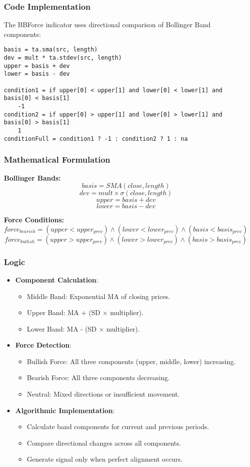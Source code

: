 \documentclass[12pt]{article}
\begin{document}
\subsubsection{Code Implementation}
The BBForce indicator uses directional comparison of Bollinger Band components:

\begin{lstlisting}[language=Pine, caption=Pine Script Code for BBForce Calculation]
basis = ta.sma(src, length)
dev = mult * ta.stdev(src, length)
upper = basis + dev
lower = basis - dev

condition1 = if upper[0] < upper[1] and lower[0] < lower[1] and basis[0] < basis[1]
    -1
condition2 = if upper[0] > upper[1] and lower[0] > lower[1] and basis[0] > basis[1]
    1
conditionFull = condition1 ? -1 : condition2 ? 1 : na
\end{lstlisting}

\subsubsection{Mathematical Formulation}
\textbf{Bollinger Bands:}
\[
basis = SMA(close, length)
\]
\[
dev = mult \times \sigma(close, length)
\]
\[
upper = basis + dev
\]
\[
lower = basis - dev
\]

\textbf{Force Conditions:}
\[
force_{bearish} = (upper < upper_{prev}) \land (lower < lower_{prev}) \land (basis < basis_{prev})
\]
\[
force_{bullish} = (upper > upper_{prev}) \land (lower > lower_{prev}) \land (basis > basis_{prev})
\]

\subsubsection{Logic}
\begin{itemize}
\item \textbf{Component Calculation}:
  \begin{itemize}
  \item Middle Band: Exponential MA of closing prices.
  \item Upper Band: MA + (SD × multiplier).
  \item Lower Band: MA - (SD × multiplier).
  \end{itemize}
\item \textbf{Force Detection}:
  \begin{itemize}
  \item Bullish Force: All three components (upper, middle, lower) increasing.
  \item Bearish Force: All three components decreasing.
  \item Neutral: Mixed directions or insufficient movement.
  \end{itemize}
\item \textbf{Algorithmic Implementation}:
  \begin{itemize}
  \item Calculate band components for current and previous periods.
  \item Compare directional changes across all components.
  \item Generate signal only when perfect alignment occurs.
  \end{itemize}
\end{itemize}
\end{document}
